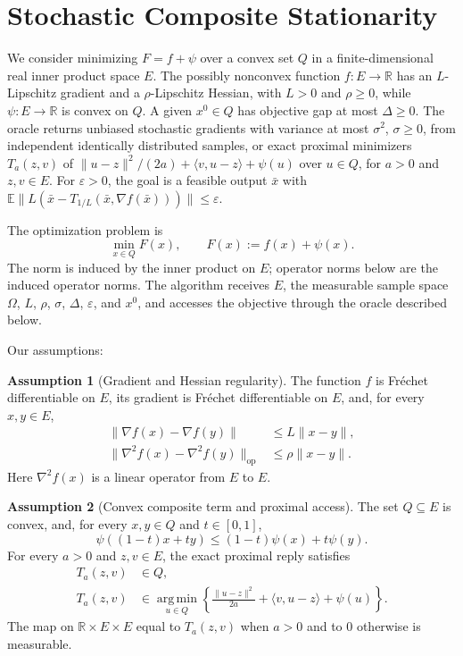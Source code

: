 \documentclass[10pt]{article}
\theoremstyle{definition}
\newtheorem{assumption}{Assumption}
\begin{document}
\section*{Stochastic Composite Stationarity}
We consider minimizing $F=f+\psi$ over a convex set $Q$ in a finite-dimensional real inner product space $E$. The possibly nonconvex function $f:E\to\mathbb{R}$ has an $L$-Lipschitz gradient and a $\rho$-Lipschitz Hessian, with $L>0$ and $\rho\geq0$, while $\psi:E\to\mathbb{R}$ is convex on $Q$. A given $x^0\in Q$ has objective gap at most $\Delta\geq0$. The oracle returns unbiased stochastic gradients with variance at most $\sigma^2$, $\sigma\geq0$, from independent identically distributed samples, or exact proximal minimizers $T_a(z,v)$ of $\|u-z\|^2/(2a)+\langle v,u-z\rangle+\psi(u)$ over $u\in Q$, for $a>0$ and $z,v\in E$. For $\varepsilon>0$, the goal is a feasible output $\bar{x}$ with $\mathbb{E}\|L(\bar{x}-T_{1/L}(\bar{x},\nabla f(\bar{x})))\|\leq\varepsilon$.

The optimization problem is
\[
\min_{x\in Q} F(x),
\qquad F(x):=f(x)+\psi(x).
\]
The norm is induced by the inner product on $E$; operator norms below are the induced operator norms. The algorithm receives $E$, the measurable sample space $\Omega$, $L$, $\rho$, $\sigma$, $\Delta$, $\varepsilon$, and $x^0$, and accesses the objective through the oracle described below.

Our assumptions:
\begin{assumption}[Gradient and Hessian regularity]
The function $f$ is Fr\'echet differentiable on $E$, its gradient is Fr\'echet differentiable on $E$, and, for every $x,y\in E$,
\[
\begin{aligned}
\|\nabla f(x)-\nabla f(y)\|&\leq L\|x-y\|,\\
\|\nabla^2 f(x)-\nabla^2 f(y)\|_{\mathrm{op}}&\leq\rho\|x-y\|.
\end{aligned}
\]
Here $\nabla^2 f(x)$ is a linear operator from $E$ to $E$.
\end{assumption}

\begin{assumption}[Convex composite term and proximal access]
The set $Q\subseteq E$ is convex, and, for every $x,y\in Q$ and $t\in[0,1]$,
\[
\psi((1-t)x+ty)\leq(1-t)\psi(x)+t\psi(y).
\]
For every $a>0$ and $z,v\in E$, the exact proximal reply satisfies
\[
\begin{aligned}
T_a(z,v)&\in Q,\\
T_a(z,v)&\in\operatorname*{arg\,min}_{u\in Q}
\left\{\frac{\|u-z\|^2}{2a}
+\langle v,u-z\rangle+\psi(u)\right\}.
\end{aligned}
\]
The map on $\mathbb{R}\times E\times E$ equal to $T_a(z,v)$ when $a>0$ and to $0$ otherwise is measurable.
\end{assumption}
\end{document}
